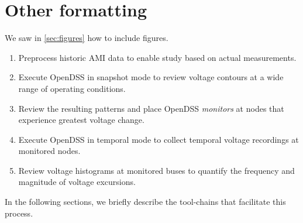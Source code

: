 \documentclass[12pt]{report}
\begin{document}
\singlespacing

\doublespacing

\section{Other formatting}
We saw in \ref{sec:figures} how to include figures.
\singlespacing
\begin{enumerate}
  \item Preprocess historic AMI data to enable study based on actual measurements.
  \item Execute OpenDSS in snapshot mode to review voltage contours at a wide
        range of operating conditions.
  \item Review the resulting patterns and place OpenDSS \emph{monitors} at
        nodes that experience greatest voltage change.
  \item Execute OpenDSS in temporal mode to collect temporal voltage recordings
        at monitored nodes.
  \item Review voltage histograms at monitored buses to quantify the frequency
        and magnitude of voltage excursions.
\end{enumerate}
\doublespacing

In the following sections, we briefly describe the tool-chains that facilitate
this process.

\clearpage

% 

\clearpage
\end{document}
